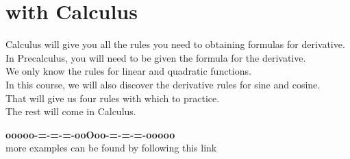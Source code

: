 \documentclass{ximera}
\begin{document}
\section*{with Calculus}


Calculus will give you all the rules you need to obtaining formulas for derivative.  In Precalculus, you will need to be given the formula for the derivative.\\


We only know the rules for linear and quadratic functions. \\


In this course, we will also discover the derivative rules for sine and cosine. \\

That will give us four rules with which to practice. \\


The rest will come in Calculus. 











\begin{center}
\textbf{\textcolor{green!50!black}{ooooo-=-=-=-ooOoo-=-=-=-ooooo}} \\

more examples can be found by following this link\\ 

\end{center}
\end{document}
